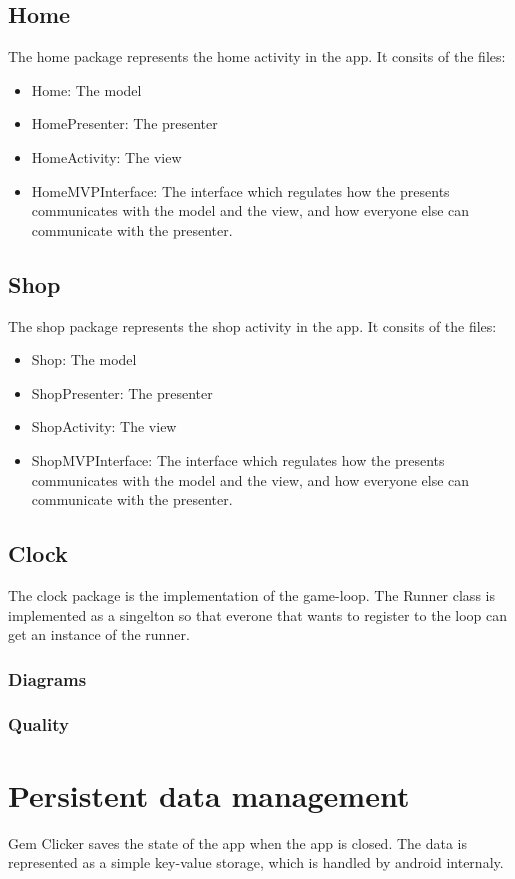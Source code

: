 \documentclass{article}
\begin{document}
\subsection{Home}
The home package represents the home activity in the app. It consits of the files:
\begin{itemize}
    \item Home: The model
    \item HomePresenter: The presenter
    \item HomeActivity: The view
    \item HomeMVPInterface: The interface which regulates how the presents communicates with the model and the view, and how everyone else can communicate with the presenter.
\end{itemize}

\subsection{Shop}
The shop package represents the shop activity in the app. It consits of the files:
\begin{itemize}
    \item Shop: The model
    \item ShopPresenter: The presenter
    \item ShopActivity: The view
    \item ShopMVPInterface: The interface which regulates how the presents communicates with the model and the view, and how everyone else can communicate with the presenter.
\end{itemize}

\subsection{Clock}
The clock package is the implementation of the game-loop. The Runner class is implemented as a singelton so that everone that wants to register to the loop can get an instance of the runner. 

\subsubsection{Diagrams}

\subsubsection{Quality}

\section{Persistent data management}
Gem Clicker saves the state of the app when the app is closed. 
The data is represented as a simple key-value storage, which is handled by android internaly.
\end{document}
